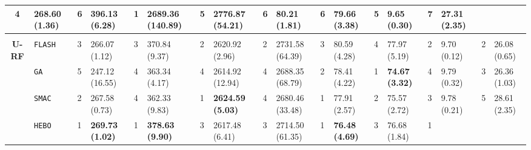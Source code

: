 \begin{tabular}{clllllllllllllllll}
  4 &
  \multicolumn{1}{l|}{268.60 (1.36)} &
  6 &
  \multicolumn{1}{l|}{396.13 (6.28)} &
  \cellcolor{blue!15}1 &
  \multicolumn{1}{l|}{\cellcolor{blue!15}\textbf{2689.36 (140.89)}} &
  5 &
  \multicolumn{1}{l|}{2776.87 (54.21)} &
  6 &
  \multicolumn{1}{l|}{80.21 (1.81)} &
  6 &
  \multicolumn{1}{l|}{79.66 (3.38)} &
  5 &
  \multicolumn{1}{l|}{9.65 (0.30)} &
  7 &
  27.31 (2.35) \\
\hline
\multicolumn{1}{l}{\textbf{}} &
    &
    &
    &
    &
    &
    &
    &
    &
    &
    &
    &
    &
    &
    &
    &
    &
    \\ \hline
\multicolumn{1}{c|}{\multirow{7}{*}{\textbf{U-RF}}} &
  \multicolumn{1}{l|}{\texttt{FLASH}} &
  3 &
  \multicolumn{1}{l|}{266.07 (1.12)} &
  3 &
  \multicolumn{1}{l|}{370.84 (9.37)} &
  2 &
  \multicolumn{1}{l|}{2620.92 (2.96)} &
  2 &
  \multicolumn{1}{l|}{2731.58 (64.39)} &
  3 &
  \multicolumn{1}{l|}{80.59 (4.28)} &
  4 &
  \multicolumn{1}{l|}{77.97 (5.19)} &
  2 &
  \multicolumn{1}{l|}{9.70 (0.12)} &
  2 &
  26.08 (0.65) \\
\multicolumn{1}{c|}{} &
  \multicolumn{1}{l|}{\texttt{GA}} &
  5 &
  \multicolumn{1}{l|}{247.12 (16.55)} &
  4 &
  \multicolumn{1}{l|}{363.34 (4.17)} &
  4 &
  \multicolumn{1}{l|}{2614.92 (12.94)} &
  4 &
  \multicolumn{1}{l|}{2688.35 (68.79)} &
  2 &
  \multicolumn{1}{l|}{78.41 (4.22)} &
  \cellcolor{blue!15}1 &
  \multicolumn{1}{l|}{\cellcolor{blue!15}\textbf{74.67 (3.32)}} &
  4 &
  \multicolumn{1}{l|}{9.79 (0.32)} &
  3 &
  26.36 (1.03) \\
\multicolumn{1}{c|}{} &
  \multicolumn{1}{l|}{\texttt{SMAC}} &
  2 &
  \multicolumn{1}{l|}{267.58 (0.73)} &
  4 &
  \multicolumn{1}{l|}{362.33 (9.83)} &
  \cellcolor{blue!15}1 &
  \multicolumn{1}{l|}{\cellcolor{blue!15}\textbf{2624.59 (5.03)}} &
  4 &
  \multicolumn{1}{l|}{2680.46 (33.48)} &
  \cellcolor{blue!15}1 &
  \multicolumn{1}{l|}{\cellcolor{blue!15}77.91 (2.57)} &
  2 &
  \multicolumn{1}{l|}{75.57 (2.72)} &
  3 &
  \multicolumn{1}{l|}{9.78 (0.21)} &
  5 &
  28.61 (2.35) \\
\multicolumn{1}{c|}{} &
  \multicolumn{1}{l|}{\texttt{HEBO}} &
  \cellcolor{blue!15}1 &
  \multicolumn{1}{l|}{\cellcolor{blue!15}\textbf{269.73 (1.02)}} &
  \cellcolor{blue!15}1 &
  \multicolumn{1}{l|}{\cellcolor{blue!15}\textbf{378.63 (9.90)}} &
  3 &
  \multicolumn{1}{l|}{2617.48 (6.41)} &
  3 &
  \multicolumn{1}{l|}{2714.50 (61.35)} &
  \cellcolor{blue!15}1 &
  \multicolumn{1}{l|}{\cellcolor{blue!15}\textbf{76.48 (4.69)}} &
  3 &
  \multicolumn{1}{l|}{76.68 (1.84)} &
  \cellcolor{blue!15}1 &

\end{tabular}
